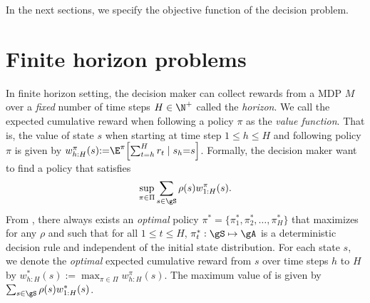 In the next sections, we specify the objective function of the decision problem.


\section{Finite horizon problems}
\label{ch:mdp:sec:finite}


In finite horizon setting, the decision maker can collect rewards from a MDP $M$ over a \emph{fixed} number of time steps $H\in\N^+$ called the \emph{horizon}.
We call the expected cumulative reward when following a policy $\pi$ as the \emph{value function}.
That is, the value of state $s$ when starting at time step $1\le h\le H$ and following policy $\pi$ is given by $w_{h:H}^\pi(s){:=}\E^\pi\Bigl[\sum_{t=h}^H r_t\mid s_h{=}s\Bigr]$.
Formally, the decision maker want to find a policy that satisfies
\begin{equation}
    \label{eq:finite_obj}
    \sup_{\pi\in\Pi}\sum_{s\in\gS}\rho(s)w_{1:H}^\pi(s).
\end{equation}
From \cite[Chapter~4]{puterman2014markov}, there always exists an \emph{optimal} policy $\pi^*=\{\pi_1^*,\pi_2^*,\dots,\pi^*_H\}$ that maximizes  for any $\rho$ and such that for all $1\le t\le H$, $\pi_t^*:\gS\mapsto\gA$ is a deterministic decision rule and independent of the initial state distribution.
For each state $s$, we denote the \emph{optimal} expected cumulative reward from $s$ over time steps $h$ to $H$ by $w_{h:H}^{*}(s){:=}\max_{\pi\in\Pi}w_{h:H}^\pi(s)$.
The maximum value of  is given by $\sum_{s\in\gS}\rho(s)w_{1:H}^*(s)$.

